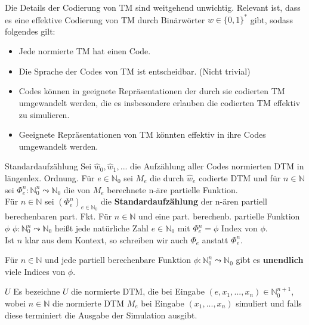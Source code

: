 Die Details der Codierung von TM sind weitgehend unwichtig. Relevant ist, dass es eine effektive Codierung 
von TM durch Binärwörter $w \in \{0,1\}^*$ gibt, sodass folgendes gilt:
\begin{itemize}
    \item Jede normierte TM hat einen Code.
    \item Die Sprache der Codes von TM ist entscheidbar. (Nicht trivial)
    \item Codes können in geeignete Repräsentationen der durch sie codierten TM umgewandelt werden, die es 
          insbesondere erlauben die codierten TM effektiv zu simulieren.
    \item Geeignete Repräsentationen von TM könnten effektiv in ihre Codes umgewandelt werden.
\end{itemize}

\begin{defn}{Standardaufzählung}
    Sei $\hat{w}_0, \hat{w}_1,...$ die Aufzählung aller Codes normierten DTM in längenlex. Ordnung. Für $e \in \mathbb{N}_0$ sei $M_e$
    die durch $\hat{w}_e$ codierte DTM und für $n \in \mathbb{N}$ sei $\Phi_e^n : \mathbb{N}_0^n \leadsto \mathbb{N}_0$ die von $M_e$ 
    berechnete n-äre partielle Funktion.\\
    
    Für $n \in \mathbb{N}$ sei $(\Phi_e^n)_{e \in \mathbb{N}_0}$ die \textbf{Standardaufzählung} der n-ären partiell berechenbaren part. Fkt. 
    Für $n \in \mathbb{N}$ und eine part. berechenb. partielle Funktion $\phi$
    $\phi : \mathbb{N}_0^n \leadsto \mathbb{N}_0$ heißt jede natürliche Zahl $e \in \mathbb{N}_0$ mit $\Phi_e^n = \phi$ Index von $\phi$. \\
    Ist $n$ klar aus dem Kontext, so schreiben wir auch $\Phi_e$ anstatt $\Phi_e^n$. \\
\end{defn}

\begin{bem}
    Für $n \in \mathbb{N}$ und jede partiell berechenbare Funktion $\phi : \mathbb{N}_0^n \leadsto \mathbb{N}_0$ gibt es \textbf{unendlich} viele Indices von $\phi$.
\end{bem}

\begin{defn}{$U$}
    Es bezeichne $U$ die normierte DTM, die bei Eingabe $(e,x_1,...,x_n) \in \mathbb{N}_0^{n+1}$, wobei $n \in \mathbb{N}$ 
    die normierte DTM $M_e$ bei Eingabe $(x_1,...,x_n)$ simuliert und falls diese terminiert die Ausgabe der Simulation ausgibt.
\end{defn}

